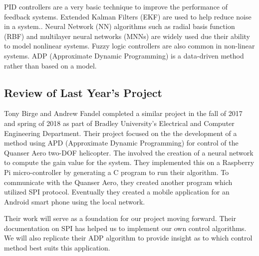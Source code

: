 \documentclass[letterpaper, 10pt, conference]{ieeeconf}
\begin{document}
PID controllers are a very basic technique to improve the performance of feedback systems.\cite{Gao2016}  Extended Kalman Filters (EKF) are used to help reduce noise in a system.\cite{Hernandez-Gonzalez2012}.  Neural Network (NN) algorithms such as radial basis function (RBF) and multilayer neural networks (MNNs) are widely used due their ability to model nonlinear systems.\cite{Hernandez-Gonzalez2012}  Fuzzy logic controllers are also common in non-linear systems.\cite{Gao2016}  ADP (Approximate Dynamic Programming) is a data-driven method rather than based on a model.\cite{Gao2016}


\subsection{Review of Last Year's Project}
Tony Birge and Andrew Fandel completed a similar project in
the fall of 2017 and spring of 2018 as part of Bradley University's Electrical and Computer Engineering Department\cite{LAST_YEAR_REPORT}.  Their project focused on the the development of a method using APD (Approximate Dynamic Programming) for control of the Quanser Aero two-DOF helicopter.  The involved the creation of a neural network to compute the gain value for the system.  They implemented this on a Raspberry Pi micro-controller by generating a C program to run their algorithm.  To communicate with the Quanser Aero, they created another program which utilized SPI protocol.  Eventually they created a mobile application for an Android smart phone using the local network.

Their work will serve as a foundation for our project moving forward.  Their documentation on SPI has helped us to implement our own control algorithms.  We will also replicate their ADP algorithm to provide insight as to which control method best suits this application.
\end{document}

